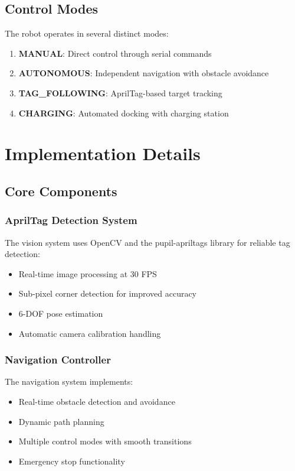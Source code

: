 \documentclass{article}
\begin{document}
\subsection{Control Modes}
The robot operates in several distinct modes:

\begin{enumerate}
    \item \textbf{MANUAL}: Direct control through serial commands
    \item \textbf{AUTONOMOUS}: Independent navigation with obstacle avoidance
    \item \textbf{TAG\_FOLLOWING}: AprilTag-based target tracking
    \item \textbf{CHARGING}: Automated docking with charging station
\end{enumerate}

\newpage
\section{Implementation Details}
\subsection{Core Components}

\subsubsection{AprilTag Detection System}
The vision system uses OpenCV and the pupil-apriltags library for reliable tag detection:
\begin{itemize}
    \item Real-time image processing at 30 FPS
    \item Sub-pixel corner detection for improved accuracy
    \item 6-DOF pose estimation
    \item Automatic camera calibration handling
\end{itemize}

\subsubsection{Navigation Controller}
The navigation system implements:
\begin{itemize}
    \item Real-time obstacle detection and avoidance
    \item Dynamic path planning
    \item Multiple control modes with smooth transitions
    \item Emergency stop functionality
\end{itemize}
\end{document}
